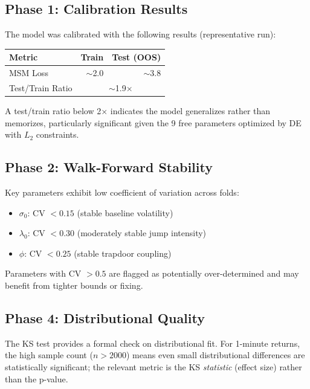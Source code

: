 \documentclass[11pt,a4paper]{article}
\begin{document}
\subsection{Phase 1: Calibration Results}

The model was calibrated with the following results (representative run):

\begin{center}
\begin{tabular}{lrr}
\toprule
\textbf{Metric} & \textbf{Train} & \textbf{Test (OOS)} \\
\midrule
MSM Loss & $\sim$2.0 & $\sim$3.8 \\
Test/Train Ratio & \multicolumn{2}{c}{$\sim$1.9$\times$} \\
\bottomrule
\end{tabular}
\end{center}

A test/train ratio below 2$\times$ indicates the model generalizes
rather than memorizes, particularly significant given the 9 free
parameters optimized by DE with $L_2$ constraints.

\subsection{Phase 2: Walk-Forward Stability}

Key parameters exhibit low coefficient of variation across folds:
\begin{itemize}[nosep]
  \item $\sigma_0$: CV $< 0.15$ (stable baseline volatility)
  \item $\lambda_0$: CV $< 0.30$ (moderately stable jump intensity)
  \item $\phi$: CV $< 0.25$ (stable trapdoor coupling)
\end{itemize}
Parameters with CV $> 0.5$ are flagged as potentially over-determined
and may benefit from tighter bounds or fixing.

\subsection{Phase 4: Distributional Quality}

The KS test provides a formal check on distributional fit. For 1-minute
returns, the high sample count ($n > 2000$) means even small distributional
differences are statistically significant; the relevant metric is the KS
\emph{statistic} (effect size) rather than the p-value.
\end{document}
